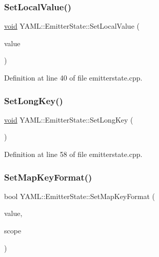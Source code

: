 \subsubsection{\texorpdfstring{SetLocalValue()}{SetLocalValue()}}
{\footnotesize\ttfamily \mbox{\hyperlink{glad_8h_a950fc91edb4504f62f1c577bf4727c29}{void}} Y\+A\+M\+L\+::\+Emitter\+State\+::\+Set\+Local\+Value (\begin{DoxyParamCaption}\item[{\mbox{\hyperlink{namespace_y_a_m_l_a67c320aa50d3de7ecba1d0b8775dd684}{E\+M\+I\+T\+T\+E\+R\+\_\+\+M\+A\+N\+IP}}}]{value }\end{DoxyParamCaption})}



Definition at line 40 of file emitterstate.\+cpp.

\mbox{\label{class_y_a_m_l_1_1_emitter_state_a9dea01a26e208270dad3765a1788e16b}} 
\subsubsection{\texorpdfstring{SetLongKey()}{SetLongKey()}}
{\footnotesize\ttfamily \mbox{\hyperlink{glad_8h_a950fc91edb4504f62f1c577bf4727c29}{void}} Y\+A\+M\+L\+::\+Emitter\+State\+::\+Set\+Long\+Key (\begin{DoxyParamCaption}{ }\end{DoxyParamCaption})}



Definition at line 58 of file emitterstate.\+cpp.

\mbox{\label{class_y_a_m_l_1_1_emitter_state_acf57f7e6528cd8bf543ab761256d41e0}} 
\subsubsection{\texorpdfstring{SetMapKeyFormat()}{SetMapKeyFormat()}}
{\footnotesize\ttfamily bool Y\+A\+M\+L\+::\+Emitter\+State\+::\+Set\+Map\+Key\+Format (\begin{DoxyParamCaption}\item[{\mbox{\hyperlink{namespace_y_a_m_l_a67c320aa50d3de7ecba1d0b8775dd684}{E\+M\+I\+T\+T\+E\+R\+\_\+\+M\+A\+N\+IP}}}]{value,  }\item[{\mbox{\hyperlink{struct_y_a_m_l_1_1_fmt_scope_a58c967eadfafdc79f62cd5c59ec2b1fe}{Fmt\+Scope\+::value}}}]{scope }\end{DoxyParamCaption})}



